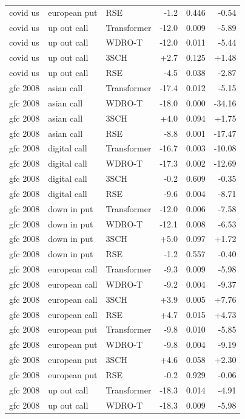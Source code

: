 \begin{table}[h]
\begin{tabular}{lllrrr}
covid us & european put & RSE & -1.2 & 0.446 & -0.54 \\
covid us & up out call & Transformer & -12.0 & 0.009 & -5.89 \\
covid us & up out call & WDRO-T & -12.0 & 0.011 & -5.44 \\
covid us & up out call & 3SCH & +2.7 & 0.125 & +1.48 \\
covid us & up out call & RSE & -4.5 & 0.038 & -2.87 \\
gfc 2008 & asian call & Transformer & -17.4 & 0.012 & -5.15 \\
gfc 2008 & asian call & WDRO-T & -18.0 & 0.000 & -34.16 \\
gfc 2008 & asian call & 3SCH & +4.0 & 0.094 & +1.75 \\
gfc 2008 & asian call & RSE & -8.8 & 0.001 & -17.47 \\
gfc 2008 & digital call & Transformer & -16.7 & 0.003 & -10.08 \\
gfc 2008 & digital call & WDRO-T & -17.3 & 0.002 & -12.69 \\
gfc 2008 & digital call & 3SCH & -0.2 & 0.609 & -0.35 \\
gfc 2008 & digital call & RSE & -9.6 & 0.004 & -8.71 \\
gfc 2008 & down in put & Transformer & -12.0 & 0.006 & -7.58 \\
gfc 2008 & down in put & WDRO-T & -12.1 & 0.008 & -6.53 \\
gfc 2008 & down in put & 3SCH & +5.0 & 0.097 & +1.72 \\
gfc 2008 & down in put & RSE & -1.2 & 0.557 & -0.40 \\
gfc 2008 & european call & Transformer & -9.3 & 0.009 & -5.98 \\
gfc 2008 & european call & WDRO-T & -9.2 & 0.004 & -9.37 \\
gfc 2008 & european call & 3SCH & +3.9 & 0.005 & +7.76 \\
gfc 2008 & european call & RSE & +4.7 & 0.015 & +4.73 \\
gfc 2008 & european put & Transformer & -9.8 & 0.010 & -5.85 \\
gfc 2008 & european put & WDRO-T & -9.8 & 0.004 & -9.19 \\
gfc 2008 & european put & 3SCH & +4.6 & 0.058 & +2.30 \\
gfc 2008 & european put & RSE & -0.2 & 0.929 & -0.06 \\
gfc 2008 & up out call & Transformer & -18.3 & 0.014 & -4.91 \\
gfc 2008 & up out call & WDRO-T & -18.3 & 0.009 & -5.98 \\

\end{tabular}
\end{table}

